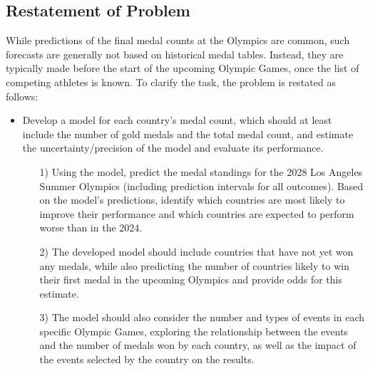 \documentclass[12pt]{article}  %
\begin{document}
\subsection{Restatement of Problem}
While predictions of the final medal counts at the Olympics are common, such forecasts are generally not based on historical medal tables. Instead, they are typically made before the start of the upcoming Olympic Games, once the list of competing athletes is known. To clarify the task, the problem is restated as follows:

\begin{itemize}
	\setlength{\parsep}{0ex} %
	\setlength{\topsep}{2ex} %
	\setlength{\itemsep}{1ex} %
	\item Develop a model for each country’s medal count, which should at least include the number of gold medals and the total medal count, and estimate the uncertainty/precision of the model and evaluate its performance.
		\begin{itemize}
		\item[1)]
Using the model, predict the medal standings for the 2028 Los Angeles Summer Olympics (including prediction intervals for all outcomes). Based on the model’s predictions, identify which countries are most likely to improve their performance and which countries are expected to perform worse than in the 2024.
	\end{itemize}
	\begin{itemize}
		\item[2)]
		The developed model should include countries that have not yet won any medals, while also predicting the number of countries likely to win their first medal in the upcoming Olympics and provide odds for this estimate.
	\end{itemize}
		\begin{itemize}
		\item[3)]
The model should also consider the number and types of events in each specific Olympic Games, exploring the relationship between the events and the number of medals won by each country, as well as the impact of the events selected by the country on the results.
	\end{itemize}
	

\end{itemize}
\end{document}
